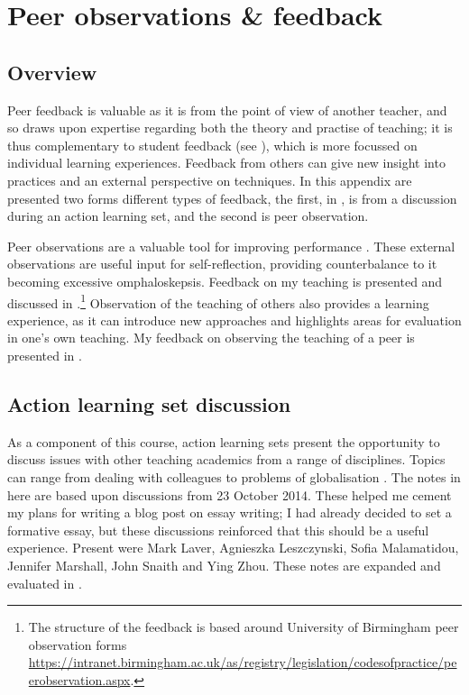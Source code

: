 \chapter{Peer observations \& feedback}\label{ap:peer}

\section{Overview}

Peer feedback is valuable as it is from the point of view of another teacher, and so draws upon expertise regarding both the theory and practise of teaching; it is thus complementary to student feedback (see ), which is more focussed on individual learning experiences. Feedback from others can give new insight into practices and an external perspective on techniques. In this appendix are presented two forms different types of feedback, the first, in , is from a discussion during an action learning set, and the second is peer observation.

Peer observations are a valuable tool for improving performance \citep{Ketteridge2015}. These external observations are useful input for self-reflection, providing counterbalance to it becoming excessive omphaloskepsis. Feedback on my teaching is presented and discussed in .\footnote{The structure of the feedback is based around University of Birmingham peer observation forms \url{https://intranet.birmingham.ac.uk/as/registry/legislation/codesofpractice/peerobservation.aspx}.} Observation of the teaching of others also provides a learning experience, as it can introduce new approaches and highlights areas for evaluation in one's own teaching. My feedback on observing the teaching of a peer is presented in .

\section{Action learning set discussion}\label{sec:ALS}

As a component of this course, action learning sets present the opportunity to discuss issues with other teaching academics from a range of disciplines. Topics can range from dealing with colleagues to problems of globalisation \citep[cf.]{Marshall2015}. The notes in  here are based upon discussions from 23 October 2014. These helped me cement my plans for writing a blog post on essay writing; I had already decided to set a formative essay, but these discussions reinforced that this should be a useful experience. Present were Mark Laver, Agnieszka Leszczynski, Sofia Malamatidou, Jennifer Marshall, John Snaith and Ying Zhou. These notes are expanded and evaluated in .

